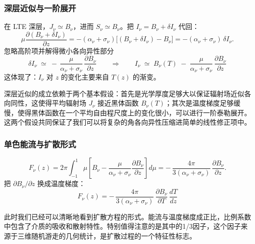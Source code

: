 \subsubsection*{深层近似与一阶展开}


在 LTE 深层，$J_\nu\simeq B_\nu$，进而 $S_\nu\simeq B_\nu$。把 $I_\nu=B_\nu+\delta I_\nu$ 代回：
\[
\mu \frac{\partial (B_\nu+\delta I_\nu)}{\partial z}
= -(\alpha_\nu+\sigma_\nu)\big[(B_\nu+\delta I_\nu)-B_\nu \big]
= -(\alpha_\nu+\sigma_\nu)\,\delta I_\nu .
\]
忽略高阶项并解得微小各向异性部分
\[
\boxed{
\delta I_\nu \;\simeq\; -\,\frac{\mu}{\alpha_\nu+\sigma_\nu}\,\frac{\partial B_\nu}{\partial z}
}
\qquad\Rightarrow\qquad
\boxed{
I_\nu \;\simeq\; B_\nu(T) \;-\; \frac{\mu}{\alpha_\nu+\sigma_\nu}\,\frac{\partial B_\nu}{\partial z}
}
\]
这体现了：$I_\nu$ 对 $z$ 的变化主要来自 $T(z)$ 的渐变。

\begin{derivationnote}[近似的两条关键假设]
深层近似的成立依赖于两个基本假设：首先是光学厚度足够大以保证辐射场近似各向同性，这使得平均辐射场 $J_\nu$ 接近黑体函数 $B_\nu(T)$；其次是温度梯度足够缓慢，使得黑体函数在一个平均自由程尺度上的变化很小，可以进行一阶泰勒展开。这两个假设共同保证了我们可以将复杂的角各向异性压缩进简单的线性修正项中。
\end{derivationnote}

\subsubsection*{单色能流与扩散形式}


\[
F_\nu(z)
= 2\pi \int_{-1}^1 \mu \left[B_\nu - \frac{\mu}{\alpha_\nu+\sigma_\nu}\frac{\partial B_\nu}{\partial z}\right] d\mu
= -\,\frac{4\pi}{3(\alpha_\nu+\sigma_\nu)}\,\frac{\partial B_\nu}{\partial z}.
\]
把 $\partial B_\nu/\partial z$ 换成温度梯度：
\[
\boxed{
F_\nu(z) = -\,\frac{4\pi}{3(\alpha_\nu+\sigma_\nu)}\,
\frac{\partial B_\nu}{\partial T}\,\frac{dT}{dz}
}
\]

此时我们已经可以清晰地看到扩散方程的形式。能流与温度梯度成正比，比例系数中包含了介质的吸收和散射特性。特别值得注意的是其中的1/3因子，这个因子来源于三维随机游走的几何统计，是扩散过程的一个特征性标志。

